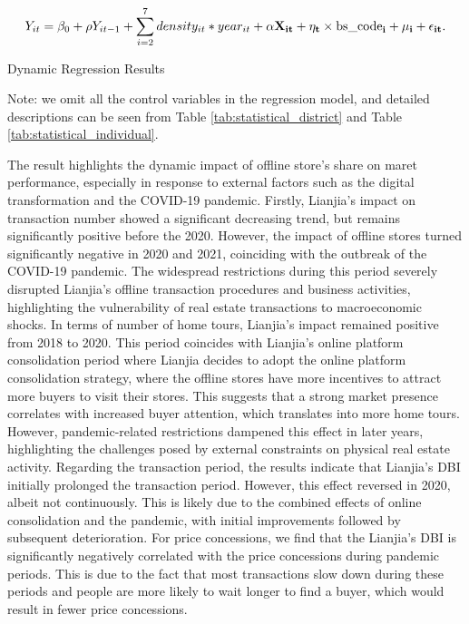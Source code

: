 \documentclass[11pt]{article}
\begin{document}
\begin{equation}
  Y_{it} = \beta_0 + \rho Y_{it-1} + \sum_{i=2}^7 density_{it} * year_{it} + \bf{\alpha} \bf{X}_{it} + \eta_{t} \times \text{bs\_code}_i + \mu_i + \epsilon_{it}. \label{eq:dynamic}
\end{equation}

\begin{table}[H]
  \begin{center}
    \begin{scriptsize}
    \caption{Dynamic Regression Results}
    \label{tab:Dynamic}
    

    Note: we omit all the control variables in the regression model, and detailed descriptions can be seen from Table \ref{tab:statistical_district} and Table \ref{tab:statistical_individual}.
    \end{scriptsize}
  \end{center}
\end{table}

The result highlights the dynamic impact of offline store's share on maret performance, especially in response to external factors such as the digital transformation and the COVID-19 pandemic. Firstly, Lianjia's impact on transaction number showed a significant decreasing trend, but remains significantly positive before the 2020. However, the impact of offline stores turned significantly negative in 2020 and 2021, coinciding with the outbreak of the COVID-19 pandemic. The widespread restrictions during this period severely disrupted Lianjia's offline transaction procedures and business activities, highlighting the vulnerability of real estate transactions to macroeconomic shocks. In terms of number of home tours, Lianjia's impact remained positive from 2018 to 2020. This period coincides with Lianjia's online platform consolidation period where Lianjia decides to adopt the online platform consolidation strategy, where the offline stores have more incentives to attract more buyers to visit their stores. This suggests that a strong market presence correlates with increased buyer attention, which translates into more home tours. However, pandemic-related restrictions dampened this effect in later years, highlighting the challenges posed by external constraints on physical real estate activity. Regarding the transaction period, the results indicate that Lianjia's DBI initially prolonged the transaction period. However, this effect reversed in 2020, albeit not continuously. This is likely due to the combined effects of online consolidation and the pandemic, with initial improvements followed by subsequent deterioration. For price concessions, we find that the Lianjia's DBI is significantly negatively correlated with the price concessions during pandemic periods. This is due to the fact that most transactions slow down during these periods and people are more likely to wait longer to find a buyer, which would result in fewer price concessions.
\end{document}
